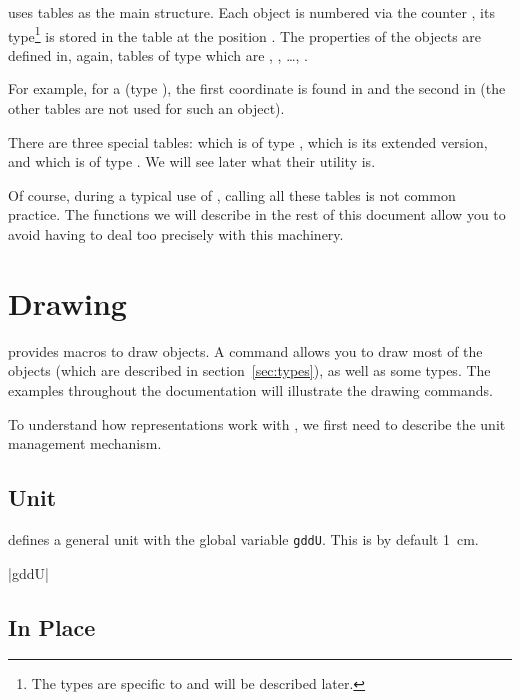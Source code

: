 \documentclass[a4paper,english]{article}
\begin{document}
\mpgeomdd uses tables as the main structure. Each object is numbered via the counter , its type\footnote{The types are specific to \mpgeomdd and will be described later.} is stored in the table  at the position . The properties of the objects are defined in, again, tables of type  which are , , \dots, .

For example, for a  (type \mpgeomdd), the first coordinate is found in  and the second in  (the other tables are not used for such an object).

There are three special tables:  which is of type ,  which is its extended version, and  which is of type . We will see later what their utility is.

Of course, during a typical use of \mpgeomdd, calling all these tables is not common practice. The functions we will describe in the rest of this document allow you to avoid having to deal too precisely with this machinery.


\section{Drawing}

\mpgeomdd provides macros to draw objects. A command allows you to draw most of the \mpgeomdd objects (which are described in section~\ref{sec:types}), as well as some \MP types. The examples throughout the documentation will illustrate the drawing commands.

To understand how representations work with \mpgeomdd, we first need to describe the unit management mechanism.

\subsection{Unit}

\mpgeomdd defines a general unit with the global variable \lstinline+gddU+. This  is by default \SI{1}{cm}.
\begin{colourband}
    \macro|gddU|
\end{colourband}

\subsection{In Place}
\end{document}
